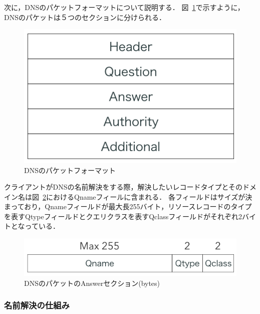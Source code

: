 次に，DNSのパケットフォーマットについて説明する．
図~\ref{fig:dns-format}で示すように，DNSのパケットは５つのセクションに分けられる．
\begin{figure}[h]
 \centering
 \includegraphics[scale=0.7]{figure/dns-format.png}
 \caption{DNSのパケットフォーマット}
 \label{fig:dns-format}
\end{figure}
クライアントがDNSの名前解決をする際，解決したいレコードタイプとそのドメイン名は図~\ref{fig:dns-answer}におけるQnameフィールに含まれる．
各フィールドはサイズが決まっており，Qnameフィールドが最大長255バイト，リソースレコードのタイプを表すQtypeフィールドとクエリクラスを表すQclassフィールドがそれぞれ2バイトとなっている．
\begin{figure}[h]
 \centering
 \includegraphics[scale=0.6]{figure/dns-answer.png}
 \caption{DNSのパケットのAnswerセクション(bytes)}
 \label{fig:dns-answer}
\end{figure}

\subsubsection{名前解決の仕組み}
\label{sec:dns-mechanism}

